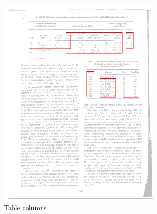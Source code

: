 \begin{figure}
\begin{subfigure}{0.30\textwidth}
\includegraphics[width=\linewidth]{img/tableDetection/tableDetectionTabCols.pdf}
\caption{Table columns}
\label{fig:tessTableDet4}
\end{subfigure}
\quad
\begin{subfigure}{0.30\textwidth}

\end{subfigure}
\end{figure}
